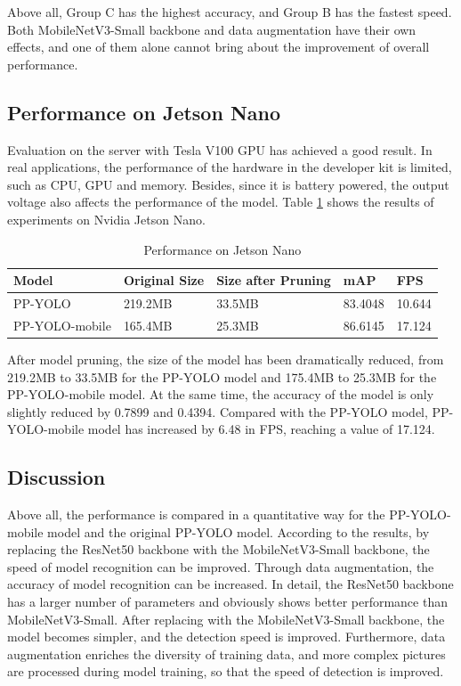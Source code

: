 \documentclass[sensors,article,submit,moreauthors,pdftex]{Definitions/mdpi}
\begin{document}
\begin{paracol}{2}
Above all, Group C has the highest accuracy, and Group B has the fastest speed. Both MobileNetV3-Small backbone and data augmentation have their own effects, and one of them alone cannot bring about the improvement of overall performance.


\subsection{Performance on Jetson Nano}
Evaluation on the server with Tesla V100 GPU has achieved a good result. In real applications, the performance of the hardware in the developer kit is limited, such as CPU, GPU and memory. Besides, since it is battery powered, the output voltage also affects the performance of the model. Table \ref{tbl:performance on Jetson Nano} shows the results of experiments on Nvidia Jetson Nano.


\begin{table}[H]
\centering
\caption{Performance on Jetson Nano}
\begin{tabular}{lllll} 
\toprule
\textbf{Model}&\textbf{Original Size}&\textbf{Size after Pruning}&\textbf{mAP}&\textbf{FPS}\\
\midrule
PP-YOLO  & 219.2MB&33.5MB&83.4048&10.644\\
PP-YOLO-mobile &165.4MB & 25.3MB&86.6145&17.124\\
\bottomrule
\end{tabular}
\label{tbl:performance on Jetson Nano}
\end{table}


After model pruning, the size of the model has been dramatically reduced, from 219.2MB to 33.5MB for the PP-YOLO model and 175.4MB to 25.3MB for the PP-YOLO-mobile model. At the same time, the accuracy of the model is only slightly reduced by 0.7899 and 0.4394. Compared with the PP-YOLO model, PP-YOLO-mobile model has increased by 6.48 in FPS, reaching a value of 17.124.



\subsection{Discussion}
Above all, the performance is compared in a quantitative way for the PP-YOLO-mobile model and the original PP-YOLO model. According to the results, by replacing the ResNet50 backbone with the MobileNetV3-Small backbone, the speed of model recognition can be improved. Through data augmentation, the accuracy of model recognition can be increased. In detail, the ResNet50 backbone has a larger number of parameters and obviously shows better performance than MobileNetV3-Small. After replacing with the MobileNetV3-Small backbone, the model becomes simpler, and the detection speed is improved. Furthermore, data augmentation enriches the diversity of training data, and more complex pictures are processed during model training, so that the speed of detection is improved.


\end{paracol}
\end{document}
